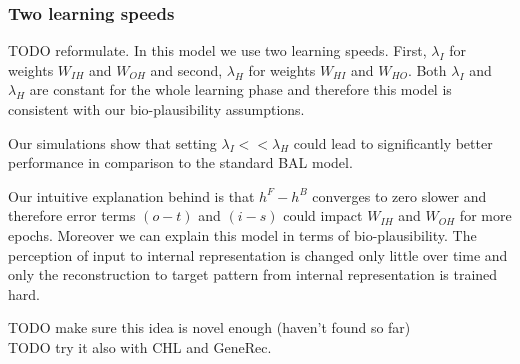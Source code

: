 
\subsubsection{Two learning speeds} 
TODO reformulate. 
In this model we use two learning speeds. First, $\lambda_I$ for weights $W_{IH}$ and $W_{OH}$ and second, $\lambda_H$ for weights $W_{HI}$ and $W_{HO}$. Both $\lambda_I$ and $\lambda_H$ are constant for the whole learning phase and therefore this model is consistent with our bio-plausibility assumptions. 

Our simulations show that setting $\lambda_I << \lambda_H$ could lead to significantly better performance in comparison to the standard BAL model. 

Our intuitive explanation behind is that $h^F - h^B$ converges to zero slower and therefore error terms $(o - t)$ and $(i - s)$ could impact $W_{IH}$ and $W_{OH}$ for more epochs. Moreover we can explain this model in terms of bio-plausibility. The perception of input to internal representation is changed only little over time and only the reconstruction to target pattern from internal representation is trained hard. 

TODO make sure this idea is novel enough (haven't found so far) \\
TODO try it also with CHL and GeneRec.  \\ 
